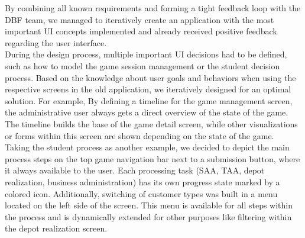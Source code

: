 By combining all known requirements and forming a tight feedback loop with the DBF team, we managed to iteratively create an application with the most important UI concepts implemented and already received positive feedback regarding the user interface. \\

During the design process, multiple important UI decisions had to be defined, such as how to model the game session management or the student decision process. Based on the knowledge about user goals and behaviors when using the respective screens in the old application, we iteratively designed for an optimal solution. For example, By defining a timeline for the game management screen, the administrative user always gets a direct overview of the state of the game. The timeline builds the base of the game detail screen, while other visualizations or forms within this screen are shown depending on the state of the game. \\

Taking the student process as another example, we decided to depict the main process steps on the top game navigation bar next to a submission button, where it always available to the user. Each processing task (SAA, TAA, depot realization, business administration) has its own progress state marked by a colored icon. Additionally, switching of customer types was built in a menu located on the left side of the screen. This menu is available for all steps within the process and is dynamically extended for other purposes like filtering within the depot realization screen.\\

